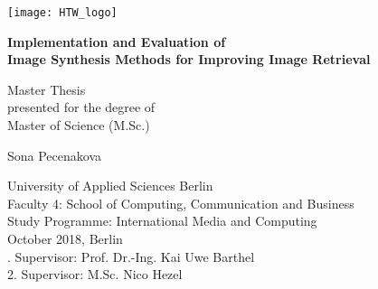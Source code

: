 \begin{titlepage}
    \begin{center}
    		\vspace{4cm}
		\texttt{[image: HTW\_logo]}    
		\vspace{1.5cm}
        
        \Large
        \textbf{Implementation and Evaluation of \\ Image Synthesis Methods for Improving Image Retrieval}
        
        \Large
        \vspace{1cm}
        Master Thesis\\
        \vspace{1cm}
        \normalsize
        presented for the degree of\\
        Master of Science (M.Sc.)
        
        \vspace{1.5cm}
        
        \Large
        Sona Pecenakova
        
        \end{center}
      
\vspace{1.5cm}

\vfill
\normalsize
\noindent
University of Applied Sciences Berlin\\
Faculty 4: School of Computing, Communication and Business\\
Study Programme: International Media and Computing\\
	
 October 2018, Berlin\\
      
. Supervisor: Prof. Dr.-Ing. Kai Uwe Barthel\\
2. Supervisor: M.Sc. Nico Hezel\\
\vspace{2cm}
\end{titlepage}